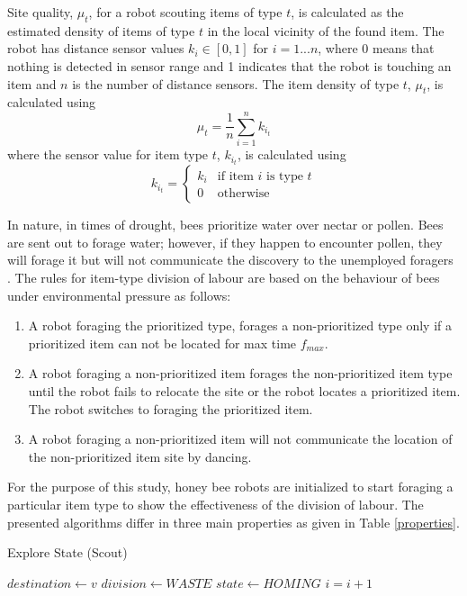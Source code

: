 Site quality, $\mu_t$, for a robot scouting items of type $t$, is calculated as the estimated density of items of type $t$ in the local vicinity of the found item. The robot has distance sensor values $k_i\in[0,1]$ for $ i = 1...n$, where 0 means that nothing is detected in sensor range and 1 indicates that the robot is touching an item and $n$ is the number of distance sensors. The item density of type $t$, $\mu_t$, is calculated using
\begin{equation}
\label{density}
\mu_t = \frac{1}{n}\sum\limits_{i=1}^n k_{i_t}
\end{equation}
where the sensor value for item type $t$, $k_{i_t}$, is calculated using 
\begin{equation}
\label{densitytype}
k_{i_t}=
    \begin{cases}
      k_i & \text{if item $i$ is type $t$} \\
      0 & \text{otherwise}
    \end{cases}
\end{equation}

In nature, in times of drought, bees prioritize water over nectar or pollen. Bees are sent out to forage water; however, if they happen to encounter pollen, they will forage it but will not communicate the discovery to the unemployed foragers  \cite{seeley2009wisdom}. The rules for item-type division of labour are based on the behaviour of bees under environmental pressure as follows:

\begin{enumerate}
\item A robot foraging the prioritized type, forages a non-prioritized type only if a prioritized item can not be located for max time $f_{max}$.
\item A robot foraging a non-prioritized item forages the non-prioritized item type until the robot fails to relocate the site or the robot locates a prioritized item. The robot switches to foraging the prioritized item.
\item A robot foraging a non-prioritized item will not communicate the location of the non-prioritized item site by dancing. 
\end{enumerate}

For the purpose of this study, honey bee robots are initialized to start foraging a particular item type to show the effectiveness of the division of labour. The presented algorithms differ in three main properties as given in Table \ref{properties}.

\begin{algorithm}
\caption{Explore State (Scout)}
\label{algorithm:explore}
\begin{algorithmic}[1]
\State {}
\State {}
 	\State {}
	\State $destination \gets v$
	\State {}
	\State $division \gets WASTE$
	\State $state \gets HOMING$
\EndIf
\State $i =i + 1$
\EndFunction
\end{algorithmic}
\end{algorithm}

